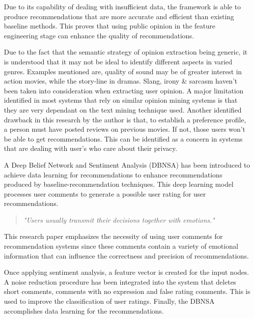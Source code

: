 Due to its capability of dealing with insufficient data, the framework is able to produce recommendations that are more accurate and efficient than existing baseline methods. This proves that using public opinion in the feature engineering stage can enhance the quality of recommendations.

Due to the fact that the semantic strategy of opinion extraction being generic, it is understood that it may not be ideal to identify different aspects in varied genres. Examples mentioned are, quality of sound may be of greater interest in action movies, while the story-line in dramas.
Slang, irony \& sarcasm haven't been taken into consideration when extracting user opinion.
A major limitation identified in most systems that rely on similar opinion mining systems is that they are very dependant on the text mining technique used. Another identified drawback in this research by the author is that, to establish a preference profile, a person must have posted reviews on previous movies. If not, those users won't be able to get recommendations. This can be identified as a concern in systems that are dealing with user's who care about their privacy.

\bigbreak

A Deep Belief Network and Sentiment Analysis (DBNSA) has been introduced to achieve data learning for recommendations \autocite{chen_user_2019} to enhance recommendations produced by baseline-recommendation techniques. This deep learning model  processes user comments to generate a possible user rating for user recommendations.

\begin{quote} 
\centering 
\emph{"Users usually transmit their decisions together with emotions."} 
\\
\raggedleft
\autocite{chen_user_2019}
\end{quote}

This research paper emphasizes the necessity of using user comments for recommendation systems since these comments contain a variety of emotional information that can influence the correctness and precision of recommendations.

Once applying sentiment analysis, a feature vector is created for the input nodes. A noise reduction procedure has been integrated into the system that deletes short comments, comments with no expression and false rating comments. This is used to improve the classification of user ratings. Finally, the DBNSA accomplishes data learning for the recommendations.

